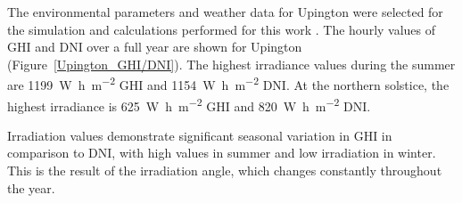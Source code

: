 The environmental parameters and weather data for Upington were selected for the simulation and calculations performed for this work \cite{WhiteBoxTechnologies2015}. The hourly values of GHI and DNI over a full year are shown for Upington (Figure~\ref{Upington_GHI/DNI}). The highest irradiance values during the summer are \SI{1199}{\watt\hour\per\square\metre} GHI and \SI{1154}{\watt\hour\per\square\metre} DNI. At the northern solstice, the highest irradiance is \SI{625}{\watt\hour\per\square\metre} GHI and \SI{820}{\watt\hour\per\square\metre} DNI. 

Irradiation values demonstrate significant seasonal variation in GHI in comparison to DNI, with high values in summer and low irradiation in winter. This is the result of the irradiation angle, which changes constantly throughout the year. 



